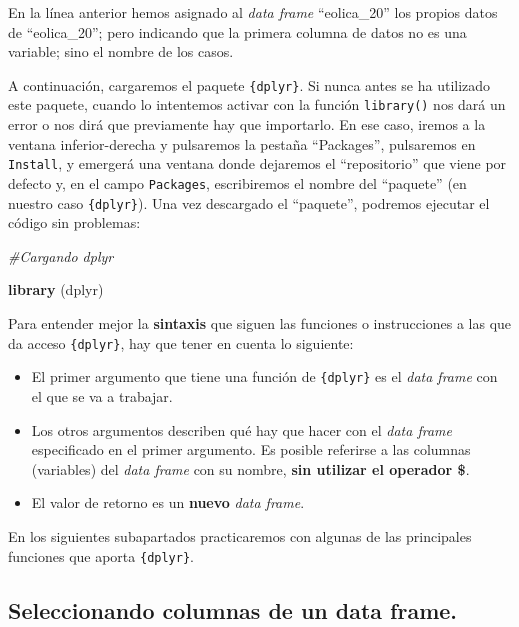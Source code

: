 \documentclass[
]{book}
\newenvironment{Shaded}{\begin{snugshade}}{\end{snugshade}}
\newcommand{\CommentTok}[1]{\textcolor[rgb]{0.56,0.35,0.01}{\textit{#1}}}
\newcommand{\FunctionTok}[1]{\textcolor[rgb]{0.13,0.29,0.53}{\textbf{#1}}}
\newcommand{\NormalTok}[1]{#1}
\begin{document}
En la línea anterior hemos asignado al \emph{data frame} ``eolica\_20'' los propios datos de ``eolica\_20''; pero indicando que la primera columna de datos no es una variable; sino el nombre de los casos.

A continuación, cargaremos el paquete \texttt{\{dplyr\}}. Si nunca antes se ha utilizado este paquete, cuando lo intentemos activar con la función \texttt{library()} nos dará un error o nos dirá que previamente hay que importarlo. En ese caso, iremos a la ventana inferior-derecha y pulsaremos la pestaña ``Packages'', pulsaremos en \texttt{Install}, y emergerá una ventana donde dejaremos el ``repositorio'' que viene por defecto y, en el campo \texttt{Packages}, escribiremos el nombre del ``paquete'' (en nuestro caso \texttt{\{dplyr\}}). Una vez descargado el ``paquete'', podremos ejecutar el código sin problemas:

\begin{Shaded}
\begin{Highlighting}[]
\CommentTok{\#Cargando dplyr}

\FunctionTok{library}\NormalTok{ (dplyr)}
\end{Highlighting}
\end{Shaded}

Para entender mejor la \textbf{sintaxis} que siguen las funciones o instrucciones a las que da acceso \texttt{\{dplyr\}}, hay que tener en cuenta lo siguiente:

\begin{itemize}
\item
  El primer argumento que tiene una función de \texttt{\{dplyr\}} es el \emph{data frame} con el que se va a trabajar.
\item
  Los otros argumentos describen qué hay que hacer con el \emph{data frame} especificado en el primer argumento. Es posible referirse a las columnas (variables) del \emph{data frame} con su nombre, \textbf{sin utilizar el operador \$}.
\item
  El valor de retorno es un \textbf{nuevo} \emph{data frame}.
\end{itemize}

En los siguientes subapartados practicaremos con algunas de las principales funciones que aporta \texttt{\{dplyr\}}.

\subsection{Seleccionando columnas de un data frame.}\label{seleccionando-columnas-de-un-data-frame.}
\end{document}
